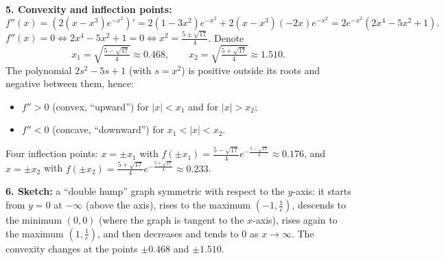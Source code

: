 \begin{solution}
\textbf{5. Convexity and inflection points:}
\[ f''(x)=\left(2(x-x^3)e^{-x^2}\right)'=2(1-3x^2)e^{-x^2}+2(x-x^3)(-2x)e^{-x^2}=2e^{-x^2}\left(2x^4-5x^2+1\right). \]
$f''(x)=0\iff 2x^4-5x^2+1=0\iff x^2=\frac{5\pm\sqrt{17}}{4}$. Denote
\[ x_1=\sqrt{\tfrac{5-\sqrt{17}}{4}}\approx0.468,\qquad x_2=\sqrt{\tfrac{5+\sqrt{17}}{4}}\approx1.510. \]
The polynomial $2s^2-5s+1$ (with $s=x^2$) is positive outside its roots and negative between them, hence:
\begin{itemize}
  \item $f''>0$ (convex, ``upward'') for $|x|<x_1$ and for $|x|>x_2$;
  \item $f''<0$ (concave, ``downward'') for $x_1<|x|<x_2$.
\end{itemize}
Four inflection points: $x=\pm x_1$ with $f(\pm x_1)=\frac{5-\sqrt{17}}{4}e^{-\frac{5-\sqrt{17}}{4}}\approx0.176$, and $x=\pm x_2$ with $f(\pm x_2)=\frac{5+\sqrt{17}}{4}e^{-\frac{5+\sqrt{17}}{4}}\approx0.233$.

\textbf{6. Sketch:} a ``double hump'' graph symmetric with respect to the $y$-axis: it starts from $y=0$ at $-\infty$ (above the axis), rises to the maximum $\left(-1,\frac1e\right)$, descends to the minimum $(0,0)$ (where the graph is tangent to the $x$-axis), rises again to the maximum $\left(1,\frac1e\right)$, and then decreases and tends to $0$ as $x\to\infty$. The convexity changes at the points $\pm0.468$ and $\pm1.510$.
\end{solution}
